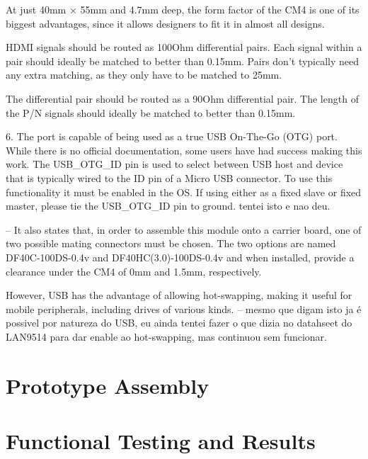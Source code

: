     At just 40mm $\times$ 55mm and 4.7mm deep, the form factor of the CM4 is one of its biggest advantages, since it allows designers to fit it in almost all designs.

    HDMI signals should be routed as 100Ohm differential pairs. Each signal within a pair should ideally be matched to better than 0.15mm. Pairs don't typically need any extra matching, as they only have to be matched to 25mm.

    The differential pair should be routed as a 90Ohm differential pair. The length of the P/N signals should ideally be matched to better than 0.15mm.

    6. The port is capable of being used as a true USB On-The-Go (OTG) port. While there is no official documentation, some users have had success making this work. The USB\_OTG\_ID pin is used to select between USB host and device that is typically wired to the ID pin of a Micro USB connector. To use this functionality it must be enabled in the OS. If using either as a fixed slave or fixed master, please tie the USB\_OTG\_ID pin to ground. tentei isto e nao deu.

	-- It also states that, in order to assemble this module onto a carrier board, one of two possible mating connectors must be chosen. The two options are named DF40C-100DS-0.4v and DF40HC(3.0)-100DS-0.4v and when installed, provide a clearance under the CM4 of 0mm and 1.5mm, respectively. 

    However, USB has the advantage of allowing hot-swapping, making it useful for mobile peripherals, including drives of various kinds. -- mesmo que digam isto ja é possivel por natureza do USB, eu ainda tentei fazer o que dizia no datahseet do LAN9514 para dar enable ao hot-swapping, mas continuou sem funcionar.

\section{Prototype Assembly}\label{sec:53_PrototypeAssembly}

\section{Functional Testing and Results}\label{sec:54_FunctionalTesting}